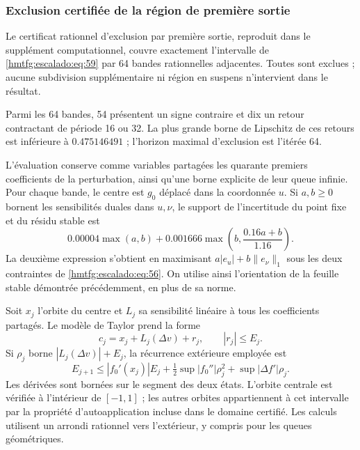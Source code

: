 \subsubsection{Exclusion certifiée de la région de première sortie}
\label{hmtfg:escalado:16.3}

Le certificat rationnel d’exclusion par première sortie, reproduit dans le supplément computationnel, couvre exactement l’intervalle de \eqref{hmtfg:escalado:eq:59} par 64 bandes rationnelles adjacentes. Toutes sont exclues ; aucune subdivision supplémentaire ni région en suspens n’intervient dans le résultat.

Parmi les 64 bandes, 54 présentent un signe contraire et dix un retour contractant de période 16 ou 32. La plus grande borne de Lipschitz de ces retours est inférieure à \(0.475146491\) ; l’horizon maximal d’exclusion est l’itérée 64.

L’évaluation conserve comme variables partagées les quarante premiers coefficients de la perturbation, ainsi qu’une borne explicite de leur queue infinie. Pour chaque bande, le centre est \(g_0\) déplacé dans la coordonnée \(u\). Si \(a,b\ge0\) bornent les sensibilités duales dans \(u,\nu\), le support de l’incertitude du point fixe et du résidu stable est
\begin{equation}
0.00004\max(a,b)
+0.001666\max\left(b,\frac{0.16a+b}{1.16}\right).
\label{hmtfg:escalado:eq:61}
\end{equation}
La deuxième expression s’obtient en maximisant \(a|e_u|+b\|e_\nu\|_1\) sous les deux contraintes de \eqref{hmtfg:escalado:eq:56}. On utilise ainsi l’orientation de la feuille stable démontrée précédemment, en plus de sa norme.

Soit \(x_j\) l’orbite du centre et \(L_j\) sa sensibilité linéaire à tous les coefficients partagés. Le modèle de Taylor prend la forme
\[
c_j=x_j+L_j(\Delta v)+r_j,\qquad |r_j|\le E_j.
\]
Si \(\rho_j\) borne \(|L_j(\Delta v)|+E_j\), la récurrence extérieure employée est
\begin{equation}
E_{j+1}\le |f_0'(x_j)|E_j
+\tfrac12\sup|f_0''|\rho_j^2
+\sup|\Delta f'|\rho_j.
\label{hmtfg:escalado:eq:62}
\end{equation}
Les dérivées sont bornées sur le segment des deux états. L’orbite centrale est vérifiée à l’intérieur de \([-1,1]\) ; les autres orbites appartiennent à cet intervalle par la propriété d’autoapplication incluse dans le domaine certifié. Les calculs utilisent un arrondi rationnel vers l’extérieur, y compris pour les queues géométriques.

